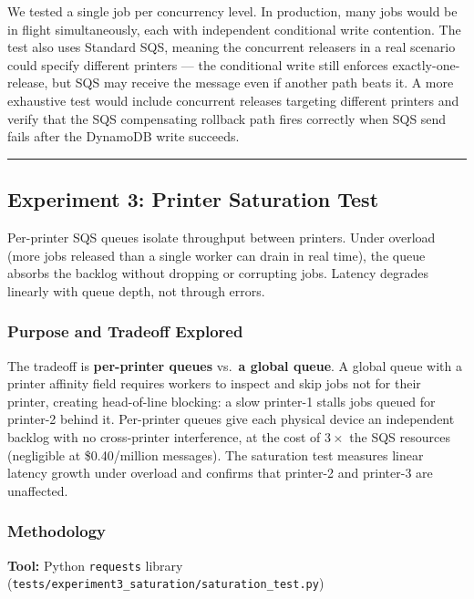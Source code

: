 \documentclass[11pt,letterpaper]{article}
\newcommand{\code}[1]{\texttt{\small #1}}
\begin{document}
\begin{limitbox}
We tested a single job per concurrency level. In production, many jobs would be in flight simultaneously, each with independent conditional write contention. The test also uses Standard SQS, meaning the concurrent releasers in a real scenario could specify different printers --- the conditional write still enforces exactly-one-release, but SQS may receive the message even if another path beats it. A more exhaustive test would include concurrent releases targeting different printers and verify that the SQS compensating rollback path fires correctly when SQS send fails after the DynamoDB write succeeds.
\end{limitbox}

\medskip\hrule\medskip

\subsection{Experiment 3: Printer Saturation Test}
\label{sec:exp3}

\begin{claimbox}
Per-printer SQS queues isolate throughput between printers. Under overload (more jobs released than a single worker can drain in real time), the queue absorbs the backlog without dropping or corrupting jobs. Latency degrades linearly with queue depth, not through errors.
\end{claimbox}

\subsubsection{Purpose and Tradeoff Explored}
The tradeoff is \textbf{per-printer queues} vs.\ \textbf{a global queue}. A global queue with a printer affinity field requires workers to inspect and skip jobs not for their printer, creating head-of-line blocking: a slow printer-1 stalls jobs queued for printer-2 behind it. Per-printer queues give each physical device an independent backlog with no cross-printer interference, at the cost of $3\times$ the SQS resources (negligible at \$0.40/million messages). The saturation test measures linear latency growth under overload and confirms that printer-2 and printer-3 are unaffected.

\subsubsection{Methodology}
\textbf{Tool:} Python \code{requests} library (\code{tests/experiment3\_saturation/saturation\_test.py})
\end{document}
